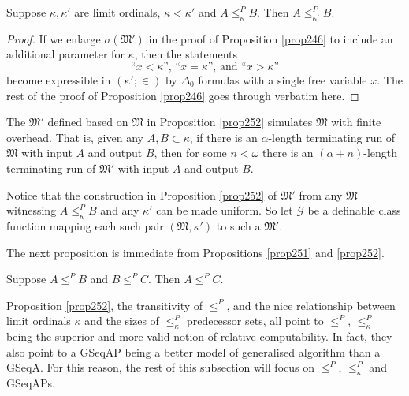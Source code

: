\documentclass[12pt]{article}
\numberwithin{equation}{section}
\begin{document}
\begin{prop}\label{prop252}
Suppose $\kappa, \kappa'$ are limit ordinals, $\kappa < \kappa'$ and $A \leq^P_{\kappa} B$. Then $A \leq^P_{\kappa'} B$.
\end{prop}

\begin{proof}
If we enlarge $\sigma(\mathfrak{M}')$ in the proof of Proposition \ref{prop246} to include an additional parameter for $\kappa$, then the statements
\begin{equation*}
    \text{``} x < \kappa \text{'', ``} x = \kappa \text{'', and ``} x > \kappa \text{''}
\end{equation*}
become expressible in $(\kappa'; \in)$ by $\Delta_0$ formulas with a single free variable $x$. The rest of the proof of Proposition \ref{prop246} goes through verbatim here.
\end{proof}

\begin{rem}\label{rem256}
The $\mathfrak{M}'$ defined based on $\mathfrak{M}$ in Proposition \ref{prop252} simulates $\mathfrak{M}$ with finite overhead. That is, given any $A, B \subset \kappa$, if there is an $\alpha$-length terminating run of $\mathfrak{M}$ with input $A$ and output $B$, then for some $n < \omega$ there is an $(\alpha + n)$-length terminating run of $\mathfrak{M}'$ with input $A$ and output $B$.
\end{rem}

Notice that the construction in Proposition \ref{prop252} of $\mathfrak{M}'$ from any $\mathfrak{M}$ witnessing $A \leq^P_{\kappa} B$ and any $\kappa'$ can be made uniform. So let $\mathcal{G}$ be a definable class function mapping each such pair $(\mathfrak{M}, \kappa')$ to such a $\mathfrak{M}'$.

The next proposition is immediate from Propositions \ref{prop251} and \ref{prop252}.

\begin{prop}
Suppose $A \leq^P B$ and $B \leq^P C$. Then $A \leq^P C$.
\end{prop} 

Proposition \ref{prop252}, the transitivity of $\leq^P$, and the nice relationship between limit ordinals $\kappa$ and the sizes of $\leq^P_{\kappa}$ predecessor sets, all point to $\leq^P$, $\leq^P_{\kappa}$ being the superior and more valid notion of relative computability. In fact, they also point to a GSeqAP being a better model of generalised algorithm than a GSeqA. For this reason, the rest of this subsection will focus on $\leq^P$, $\leq^P_{\kappa}$ and GSeqAPs.
\end{document}
